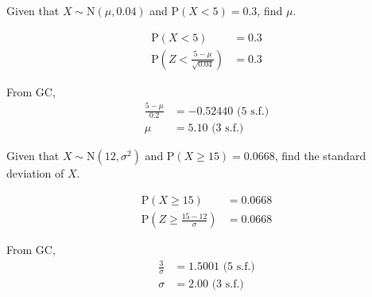 \documentclass[11pt,a4paper]{book}
\begin{document}
\begin{example}

Given that $X\sim\text{N}\left(\mu,0.04\right)$ and $\text{P}\left(X<5\right)=0.3$,
find $\mu$.

\Solution

\begin{align*}
\text{P}\left(X<5\right) & =0.3\\
\text{P}\left(Z<\frac{5-\mu}{\sqrt{0.04}}\right) & =0.3
\end{align*}

From GC,
\begin{align*}
\frac{5-\mu}{0.2} & =-0.52440\text{ (5 s.f.)}\\
\mu & =5.10\text{ (3 s.f.)}
\end{align*}

\end{example}

\begin{example}

Given that $X\sim\text{N}\left(12,\sigma^{2}\right)$ and $\text{P}\left(X\geq15\right)=0.0668$,
find the standard deviation of $X$.

\Solution

\begin{align*}
\text{P}\left(X\geq15\right) & =0.0668\\
\text{P}\left(Z\geq\frac{15-12}{\sigma}\right) & =0.0668
\end{align*}

From GC,
\begin{align*}
\frac{3}{\sigma} & =1.5001\text{ (5 s.f.)}\\
\sigma & =2.00\text{ (3 s.f.)}
\end{align*}

\end{example}

\newpage
\end{document}
